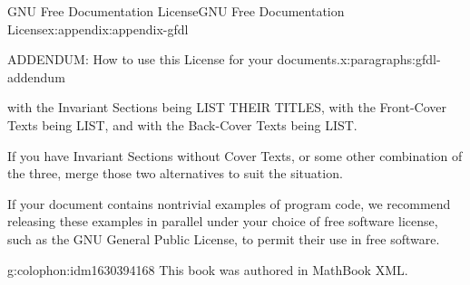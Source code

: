 \documentclass[twoside,10pt,]{book}
\newcommand{\xreffont}{\relax}
\numberwithin{equation}{part}
\providecommand\phantomsection{}
\begin{document}
\begin{appendixptx}{GNU Free Documentation License}{}{GNU Free Documentation License}{}{}{x:appendix:appendix-gfdl}
\begin{paragraphs}{ADDENDUM: How to use this License for your documents.}{x:paragraphs:gfdl-addendum}
\begin{preformatted}
with the Invariant Sections being LIST THEIR TITLES, with the
Front-Cover Texts being LIST, and with the Back-Cover Texts being LIST.
\end{preformatted}
If you have Invariant Sections without Cover Texts, or some other combination of the three, merge those two alternatives to suit the situation.%
\par
If your document contains nontrivial examples of program code, we recommend releasing these examples in parallel under your choice of free software license, such as the GNU General Public License, to permit their use in free software.%
\end{paragraphs}%
\end{appendixptx}
%
\backmatter%
%
\clearpage\phantomsection%
%
%
{\xreffont\printindex}
%
\cleardoublepage
\pagestyle{empty}
\begin{backcolophon}{g:colophon:idm1630394168}%
This book was authored in MathBook XML.%
\end{backcolophon}%
\end{document}
